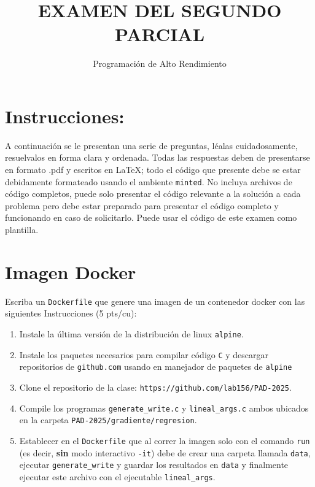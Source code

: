 \documentclass{article}
\title{EXAMEN DEL SEGUNDO PARCIAL}
\author{ Programación de Alto Rendimiento }
\begin{document}
\maketitle

\section*{Instrucciones:} A continuación se le presentan una serie de preguntas, léalas cuidadosamente, resuelvalos en forma clara y ordenada. Todas las respuestas deben de presentarse en formato .pdf y escritos en LaTeX; todo el código que presente debe se estar debidamente formateado usando el ambiente \texttt{minted}. No incluya archivos de código completos, puede solo presentar el código relevante a la solución a cada problema pero debe estar preparado para presentar el código completo y funcionando en caso de solicitarlo. Puede usar el código de este examen como plantilla.


\section{Imagen Docker}
Escriba un \texttt{Dockerfile} que genere una imagen de un contenedor docker con las siguientes Instrucciones (5 pts/cu):
\begin{enumerate}
    \item Instale la última versión de la distribución de linux \texttt{alpine}.
    \item Instale los paquetes necesarios para compilar código \texttt{C} y descargar repositorios de \texttt{github.com} usando en manejador de paquetes de \texttt{alpine}
    \item Clone el repositorio de la clase: \texttt{https://github.com/lab156/PAD-2025}.
    \item Compile los programas \texttt{generate\_write.c} y \texttt{lineal\_args.c} ambos ubicados en la carpeta \texttt{PAD-2025/gradiente/regresion}. 
    \item Establecer en el \texttt{Dockerfile} que al correr la imagen solo con el comando \texttt{run} (es decir, \textbf{sin} modo interactivo \texttt{-it}) debe de crear una carpeta llamada \texttt{data}, ejecutar \texttt{generate\_write} y guardar los resultados en \texttt{data} y finalmente ejecutar este archivo con el ejecutable \texttt{lineal\_args}. 
\end{enumerate}
\end{document}
